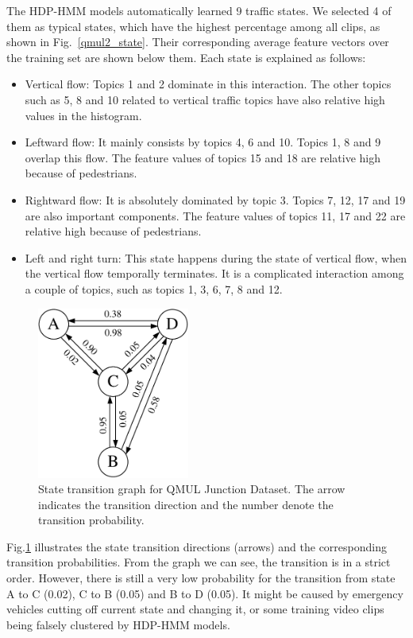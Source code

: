The HDP-HMM models automatically learned 9 traffic states. We selected 4 of them as typical states, which have the highest percentage among all clips, as shown in Fig.~\ref{qmul2_state}. Their corresponding average feature vectors over the training set are shown below them. Each state is explained as follows:
\begin{itemize}
	\item Vertical flow: Topics 1 and 2 dominate in this interaction. The other topics such as 5, 8 and 10 related to vertical traffic topics have also relative high values in the histogram.
	\item Leftward flow: It mainly consists by topics 4, 6 and 10. Topics 1, 8 and 9 overlap this flow. The feature values of topics 15 and 18 are relative high because of pedestrians.
	\item Rightward flow: It is absolutely dominated by topic 3. Topics 7, 12, 17 and 19 are also important components. The feature values of topics 11, 17 and 22 are relative high because of pedestrians.
	\item Left and right turn: This state happens during the state of vertical flow, when the vertical flow temporally terminates. It is a complicated interaction among a couple of topics, such as topics 1, 3, 6, 7, 8 and 12.
\end{itemize}

\begin{figure}[!htbp]
	\centering
	\includegraphics[width=5cm]{figures/transition_qmul-crop.pdf}
	\caption[State transition graph of QMUL Junction Dataset]{State transition graph for QMUL Junction Dataset. The arrow indicates the transition direction and the number denote the transition probability.}
	\label{fig:qmul_transition}
\end{figure}

Fig.\ref{fig:qmul_transition} illustrates the state transition directions (arrows) and the corresponding transition probabilities. From the graph we can see, the transition is in a strict order. However, there is still a very low probability for the transition from state A to C (0.02), C to B (0.05) and B to D (0.05). It might be caused by emergency vehicles cutting off current state and changing it, or some training video clips being falsely clustered by HDP-HMM models.


